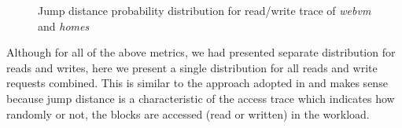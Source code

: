 \begin{figure}
	\centering
	\hfill
	\caption{Jump distance probability distribution for read/write trace of \textit{webvm} and \textit{homes}}
	\label{fig:jumpdist-read-write-distrib}
\end{figure}

Although for all of the above metrics, we had presented separate distribution
for reads and writes, here we present a single distribution for all reads
and write requests combined. This is similar to the approach adopted 
in \cite{case-for-nas-benchmarks} and makes sense because jump distance
is a characteristic of the access trace which indicates how randomly or
not, the blocks are accessed (read or written) in the workload.

